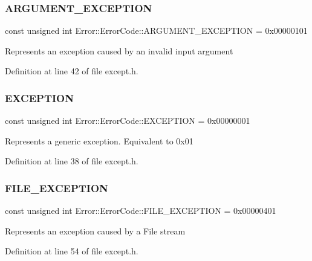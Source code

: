 \subsubsection{\texorpdfstring{A\+R\+G\+U\+M\+E\+N\+T\+\_\+\+E\+X\+C\+E\+P\+T\+I\+ON}{ARGUMENT\_EXCEPTION}}
{\footnotesize\ttfamily const unsigned int Error\+::\+Error\+Code\+::\+A\+R\+G\+U\+M\+E\+N\+T\+\_\+\+E\+X\+C\+E\+P\+T\+I\+ON = 0x00000101}

Represents an exception caused by an invalid input argument 

Definition at line 42 of file except.\+h.

\hypertarget{namespace_error_1_1_error_code_ae85b7b550a5a82a4f04d8d5df167f081}{}\label{namespace_error_1_1_error_code_ae85b7b550a5a82a4f04d8d5df167f081} 
\subsubsection{\texorpdfstring{E\+X\+C\+E\+P\+T\+I\+ON}{EXCEPTION}}
{\footnotesize\ttfamily const unsigned int Error\+::\+Error\+Code\+::\+E\+X\+C\+E\+P\+T\+I\+ON = 0x00000001}

Represents a generic exception. Equivalent to 0x01 

Definition at line 38 of file except.\+h.

\hypertarget{namespace_error_1_1_error_code_ad646bbf666b6a07dc245d1e1b47107be}{}\label{namespace_error_1_1_error_code_ad646bbf666b6a07dc245d1e1b47107be} 
\subsubsection{\texorpdfstring{F\+I\+L\+E\+\_\+\+E\+X\+C\+E\+P\+T\+I\+ON}{FILE\_EXCEPTION}}
{\footnotesize\ttfamily const unsigned int Error\+::\+Error\+Code\+::\+F\+I\+L\+E\+\_\+\+E\+X\+C\+E\+P\+T\+I\+ON = 0x00000401}

Represents an exception caused by a File stream 

Definition at line 54 of file except.\+h.

\hypertarget{namespace_error_1_1_error_code_a712ca5dd58f19a6c3804bea7d62a71d1}{}\label{namespace_error_1_1_error_code_a712ca5dd58f19a6c3804bea7d62a71d1} 
